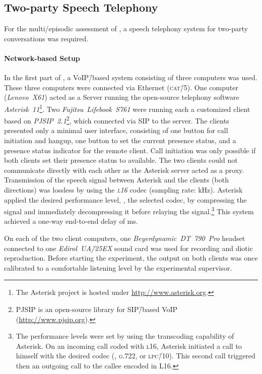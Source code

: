 \subsection{Two-party Speech Telephony}
For the multi\-/episodic assessment of , a speech telephony system for two-party conversations was required.

\paragraph*{Network-based Setup}
In the first part of , a \ac{VoIP}\=/based system consisting of three computers was used.
These three computers were connected via Ethernet (\textsc{\lowercase{CAT\=/5}}). 
One computer (\emph{Lenovo~X61}) acted as a Server running the open-source telephony software \emph{Asterisk~11}\footnote{The Asterisk project is hosted under \url{http://www.asterisk.org}.}.
Two \emph{Fujitsu~Lifebook~S761} were running each a customized client based on \emph{PJSIP~2.1}\footnote{PJSIP is an open-source library for \acs{SIP}\=/based \ac{VoIP} (\url{http://www.pjsip.org}).}, which connected via \ac{SIP} to the server.
The clients presented only a minimal user interface, consisting of one button for call initiation and hangup, one button to set the current presence status, and a presence status indicator for the remote client.
Call initiation was only possible if both clients set their presence status to available.
The two clients could not communicate directly with each other as the Asterisk server acted as a proxy.
Transmission of the speech signal between Asterisk and the clients (both directions) was lossless by using the \emph{\textsc{\lowercase{L16}}} codec (sampling rate: \unit[16]{kHz}).
Asterisk applied the desired performance level, \ie, the selected codec, by compressing the signal and immediately decompressing it before relaying the signal.\footnote{The performance levels were set by using the transcoding capability of Asterisk. On an incoming call coded with \textsc{\lowercase{L16}}, Asterisk initiated a call to himself with the desired codec (\ie, \textsc{\lowercase{G.722}}, or \textsc{\lowercase{LPC\=/10}}). This second call triggered then an outgoing call to the callee encoded in L16.}
This system achieved a one-way end-to-end delay of \unit[120]{ms}.

On each of the two client computers, one \emph{Beyerdynamic~DT~790~Pro} headset connected to one \emph{Edirol~UA\=/25EX} sound card was used for recording and diotic reproduction.
Before starting the experiment, the output on both clients was once calibrated to a comfortable listening level by the experimental supervisor.

